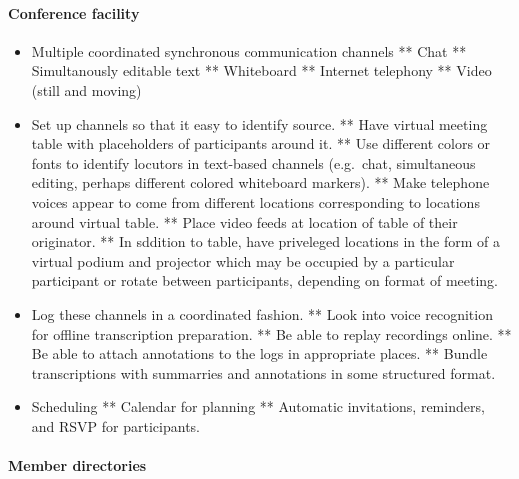 \begin{itemize}
\paragraph{Conference facility}

\begin{itemize}
\item
  Multiple coordinated synchronous communication channels ** Chat **
  Simultanously editable text ** Whiteboard ** Internet telephony **
  Video (still and moving)
\item
  Set up channels so that it easy to identify source. ** Have virtual
  meeting table with placeholders of participants around it. ** Use
  different colors or fonts to identify locutors in text-based channels
  (e.g.~chat, simultaneous editing, perhaps different colored whiteboard
  markers). ** Make telephone voices appear to come from different
  locations corresponding to locations around virtual table. ** Place
  video feeds at location of table of their originator. ** In sddition
  to table, have priveleged locations in the form of a virtual podium
  and projector which may be occupied by a particular participant or
  rotate between participants, depending on format of meeting.
\item
  Log these channels in a coordinated fashion. ** Look into voice
  recognition for offline transcription preparation. ** Be able to
  replay recordings online. ** Be able to attach annotations to the logs
  in appropriate places. ** Bundle transcriptions with summarries and
  annotations in some structured format.
\item
  Scheduling ** Calendar for planning ** Automatic invitations,
  reminders, and RSVP for participants.
\end{itemize}

\paragraph{Member directories}


\end{itemize}
